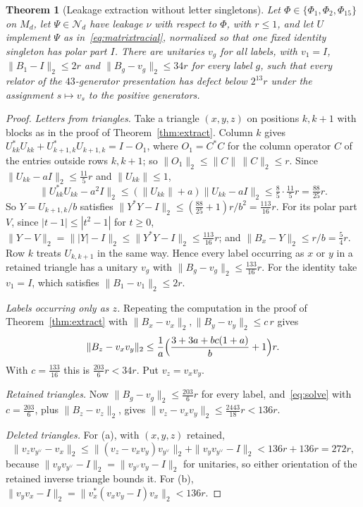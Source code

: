 \documentclass[11pt]{article}
\newtheorem{theorem}{Theorem}[section]
\newcommand{\N}{\mathcal N}
\begin{document}
\begin{theorem}[Leakage extraction without letter singletons]\label{thm:oldleak}
Let $\Phi\in\{\Phi_1,\Phi_2,\Phi_{15}\}$ on $M_d$, let $\Psi\in\N_d$ have leakage $\nu$ with respect to $\Phi$, with $r\le1$, and let $U$ implement $\Psi$ as in~\eqref{eq:matrixtracial}, normalized so that one fixed identity singleton has polar part $I$.  There are unitaries $v_g$ for all labels, with $v_1=I$, $\|B_1-I\|_2\le2r$ and $\|B_g-v_g\|_2\le34r$ for every label $g$, such that every relator of the $43$-generator presentation has defect below $2^{13}r$ under the assignment $s\mapsto v_s$ to the positive generators.
\end{theorem}
\begin{proof}
\emph{Letters from triangles.}  Take a triangle $(x,y,z)$ on positions $k,k+1$ with blocks as in the proof of Theorem~\ref{thm:extract}.  Column $k$ gives $U_{kk}^*U_{kk}+U_{k+1,k}^*U_{k+1,k}=I-O_1$, where $O_1=C^*C$ for the column operator $C$ of the entries outside rows $k,k+1$; so $\|O_1\|_2\le\|C\|\,\|C\|_2\le r$.  Since $\|U_{kk}-aI\|_2\le\tfrac{11}5r$ and $\|U_{kk}\|\le1$,
\[
 \|U_{kk}^*U_{kk}-a^2I\|_2\le(\|U_{kk}\|+a)\|U_{kk}-aI\|_2\le\tfrac85\cdot\tfrac{11}5r=\tfrac{88}{25}r.
\]
So $Y=U_{k+1,k}/b$ satisfies $\|Y^*Y-I\|_2\le(\tfrac{88}{25}+1)r/b^2=\tfrac{113}{16}r$.  For its polar part $V$, since $|t-1|\le|t^2-1|$ for $t\ge0$, $\|Y-V\|_2=\||Y|-I\|_2\le\|Y^*Y-I\|_2\le\tfrac{113}{16}r$; and $\|B_x-Y\|_2\le r/b=\tfrac54r$.  Row $k$ treats $U_{k,k+1}$ in the same way.  Hence every label occurring as $x$ or $y$ in a retained triangle has a unitary $v_g$ with $\|B_g-v_g\|_2\le\tfrac{133}{16}r$.  For the identity take $v_1=I$, which satisfies $\|B_1-v_1\|_2\le2r$.

\emph{Labels occurring only as $z$.}  Repeating the computation in the proof of Theorem~\ref{thm:extract} with $\|B_x-v_x\|_2,\|B_y-v_y\|_2\le c\,r$ gives
\begin{equation}\label{eq:solve}
 \|B_z-v_xv_y\|_2\le\frac1a\Bigl(\frac{3+3a+bc(1+a)}{b}+1\Bigr)r.
\end{equation}
With $c=\tfrac{133}{16}$ this is $\tfrac{203}6r<34r$.  Put $v_z=v_xv_y$.

\emph{Retained triangles.}  Now $\|B_g-v_g\|_2\le\tfrac{203}6r$ for every label, and~\eqref{eq:solve} with $c=\tfrac{203}6$, plus $\|B_z-v_z\|_2$, gives $\|v_z-v_xv_y\|_2\le\tfrac{2443}{18}r<136r$.

\emph{Deleted triangles.}  For (a), with $(x,y,z)$ retained,
\[
 \|v_zv_{y^\vee}-v_x\|_2\le\|(v_z-v_xv_y)v_{y^\vee}\|_2+\|v_yv_{y^\vee}-I\|_2<136r+136r=272r,
\]
because $\|v_yv_{y^\vee}-I\|_2=\|v_{y^\vee}v_y-I\|_2$ for unitaries, so either orientation of the retained inverse triangle bounds it.  For (b), $\|v_yv_x-I\|_2=\|v_x^*(v_xv_y-I)v_x\|_2<136r$.


\end{proof}
\end{document}
